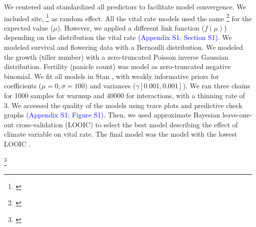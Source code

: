 \documentclass[11pt]{article}
\newcommand{\tom}[2]{{\color{red}{#1}}\footnote{\textit{\color{red}{#2}}}}
\begin{document}
{We centered and standardized all predictors to facilitate model convergence.
We included site, \tom{source, and block}{You have not described these.} as random effect.
All the vital rate models used the same \tom{linear and quadratic predictor}{show these} for the expected value ($\mu$). 
However, we applied a different link function ($f(\mu)$) depending on the distribution the vital rate \textcolor{blue}{(Appendix S1: Section S1)}. 
We modeled survival and flowering data with a Bernoulli distribution.
We modeled the growth (tiller number) with a zero-truncated Poisson inverse Gaussian distribution. 
Fertility (panicle count) was model as zero-truncated negative binomial. 
We fit all models in Stan \citep{rstan}, with weakly informative priors for coefficients ($\mu = 0, \sigma = 100$) and variances ($\gamma [0.001, 0.001]$). We ran three chains for 1000 samples for warmup and 40000 for interactions, with a thinning rate of 3.
We accessed the quality of the models using trace plots and predictive check graphs \citep{piironen2017comparison} \textcolor{blue}{(Appendix S1: Figure S1)}.
Then, we used approximate Bayesian leave-one-out cross-validation (LOOIC) to select the best model describing the effect of climate variable on vital rate. The final model was the model with the lowest LOOIC \citep{vehtari2017practical}. 

\tom{To understand the effect of climate on vital rates, we used the 95 \% credible interval of the final model for each vital rate. When the 95 \% credible interval of the coefficient of a given climatic variable did not include zero, we concluded that there is a strong effect of that variable on the vital rate. 
In contrast, when we have a credible interval of a climatic variable that includes zero, we used the empirical cumulative distribution to find the probability that the coefficient of that climatic variable is greater than zero.}{I would prefer to not interpret the coefficient posteriors in this way, because it is effectively frequentist hypothesis-testing.}


}
\end{document}
